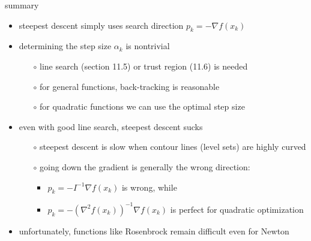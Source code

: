 \documentclass[10pt,hyperref]{beamer}
\newcommand{\grad}{\nabla}
\begin{document}
\begin{frame}{summary}

\begin{itemize}
\item steepest descent simply uses search direction $p_k = -\grad f(x_k)$
\item determining the step size $\alpha_k$ is nontrivial
    \begin{itemize}
    \item[$\circ$] line search (section 11.5) or trust region (11.6) is needed
    \item[$\circ$] for general functions, back-tracking is reasonable
    \item[$\circ$] for quadratic functions we can use the optimal step size
    \end{itemize}
\item even with good line search, steepest descent sucks
    \begin{itemize}
    \item[$\circ$] steepest descent is slow when contour lines (level sets) are highly curved

    \smallskip
    \item[$\circ$] going down the gradient is generally \alert{the wrong direction}:
        \begin{itemize}
        \item $p_k = - I^{-1} \grad f(x_k)$ is wrong, while
        \item $p_k = - (\grad^2f(x_k))^{-1} \grad f(x_k)$ is perfect for quadratic optimization
        \end{itemize}
    \end{itemize}
\item unfortunately, functions like Rosenbrock remain difficult even for Newton
\end{itemize}
\end{frame}
\end{document}
